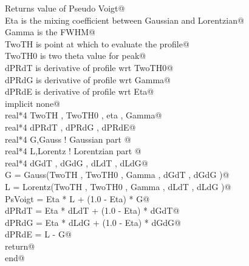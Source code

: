\documentclass[10pt,a4paper,notitlepage]{article}
\begin{document}
\begin{flushleft}
\begin{list}{}{}
\mbox{}\verb@c   Returns value of Pseudo Voigt@\\
\mbox{}\verb@c   Eta is the mixing coefficient between Gaussian and Lorentzian@\\
\mbox{}\verb@c   Gamma is the FWHM@\\
\mbox{}\verb@c   TwoTH is point at which to evaluate the profile@\\
\mbox{}\verb@c   TwoTH0 is two theta value for peak@\\
\mbox{}\verb@c   dPRdT is derivative of profile wrt TwoTH0@\\
\mbox{}\verb@c   dPRdG is derivative of profile wrt Gamma@\\
\mbox{}\verb@c   dPRdE is derivative of profile wrt Eta@\\
\mbox{}\verb@      implicit none@\\
\mbox{}\verb@      real*4 TwoTH , TwoTH0 , eta , Gamma@\\
\mbox{}\verb@      real*4 dPRdT , dPRdG , dPRdE@\\
\mbox{}\verb@      real*4  G,Gauss           ! Gaussian part @\\
\mbox{}\verb@      real*4  L,Lorentz         ! Lorentzian part @\\
\mbox{}\verb@      real*4 dGdT , dGdG , dLdT , dLdG@\\
\mbox{}\verb@      G = Gauss(TwoTH , TwoTH0 , Gamma , dGdT , dGdG )@\\
\mbox{}\verb@      L = Lorentz(TwoTH , TwoTH0 , Gamma , dLdT , dLdG )@\\
\mbox{}\verb@      PsVoigt = Eta * L + (1.0 - Eta) * G@\\
\mbox{}\verb@      dPRdT = Eta * dLdT + (1.0 - Eta) * dGdT@\\
\mbox{}\verb@      dPRdG = Eta * dLdG + (1.0 - Eta) * dGdG@\\
\mbox{}\verb@      dPRdE = L - G@\\
\mbox{}\verb@      return@\\
\mbox{}\verb@      end@\\
\mbox{}\verb@@{\NWsep}
\end{list}
\vspace{-1.5ex}
\footnotesize
\begin{list}{}{\setlength{\itemsep}{-\parsep}\setlength{\itemindent}{-\leftmargin}}

\item{}
\end{list}
\vspace{4ex}
\end{flushleft}
\newpage
\end{document}
